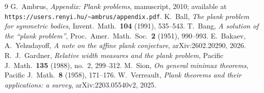 \documentclass[11pt,reqno]{amsart}
\theoremstyle{plain}
\theoremstyle{definition}
\theoremstyle{remark}
\begin{document}
\begin{thebibliography}{9}
 G.\ Ambrus, \emph{Appendix: Plank problems}, manuscript,
2010; available at \texttt{https://users.renyi.hu/\~{}ambrus/appendix.pdf}.
 K.\ Ball, \emph{The plank problem for symmetric bodies},
Invent.\ Math.\ \textbf{104} (1991), 535--543.
 T.\ Bang, \emph{A solution of the ``plank problem''},
Proc.\ Amer.\ Math.\ Soc.\ \textbf{2} (1951), 990--993.
 E.\ Bakaev, A.\ Yehudayoff, \emph{A note on the affine plank
conjecture}, arXiv:2602.20290, 2026.
 R.\ J.\ Gardner, \emph{Relative width measures and the plank
problem}, Pacific J.\ Math.\ \textbf{135} (1988), no.\ 2, 299--312.
 M.\ Sion, \emph{On general minimax theorems}, Pacific J.\
Math.\ \textbf{8} (1958), 171--176.
 W.\ Verreault, \emph{Plank theorems and their applications: a
survey}, arXiv:2203.05540v2, 2025.
\end{thebibliography}
\end{document}
